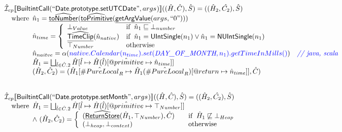 \documentclass{article}
\makeatletter
\newcommand{\SF}[1]{\mbox{\textsf{#1}}}
\newcommand{\comment}[1]{\textit{#1}}
\newcommand{\wherec}[1]{{\rm where}\begin{array}[t]{l}#1\end{array}}
\newcommand{\ifc}[1]{{\rm if}\begin{array}[t]{l}#1\end{array}}
\newcommand{\owc}{{\rm otherwise}}
\newcommand{\aI}{\hat{\mathcal{I}}}
\newcommand{\lbr}{\llbracket}
\newcommand{\rbr}{\rrbracket}
\newcommand{\hf}[1]{\underline{\sf #1}}
\newcommand{\ahf}[1]{\widehat{\underline{\sf #1}}}
\newcommand{\varprop}[1]{@#1}
\newcommand{\avarloc}[1]{\hat{\##1}}
\newcommand{\avarprop}[1]{\hat{@#1}}
\def\inblue{\color{blue}}
\def\inblue{\color{blue}}
\makeatother
\begin{document}
\[\begin{array}{l}
\aI _{cp}\lbr \SF{BuiltintCall}(``\SF{Date.prototype.setUTCDate}",args_{})\rbr((\hat{H},\hat{C}), \hat{S})
  = ((\hat{H}_2, \hat{C_2}), \hat{S})\\
\quad\wherec{
  \hat{n}_{1} = \ahf{toNumber}(\ahf{toPrimitive}(\hf{getArgValue}(args, ``0")))\\
  \hat{n}_{time} = \left\{\begin{array}{ll}
      \bot_{Value} & \ifc{\hat{n}_{1} \sqsubseteq  \bot_{number}}\\
      \ahf{TimeClip}(\hat{n}_{native})
      & \ifc{\hat{n}_{1} = \SF{UIntSingle}(n_{1}) \lor \hat{n}_{1} = \SF{NUIntSingle}(n_{1}) }\\
      \top_{Number} & \owc
    \end{array}\right.\\
  \hat{n}_{naitve} = \alpha({\inblue native.Calendar(n_{time}).set(\emph{DAY\_OF\_MONTH}, n_{1}).getTimeInMills()})
    \quad\comment{{\inblue // java, scala}}\\  
  \hat{H}_1 = \bigsqcup_{\hat{l} \in \hat{C}.2} \hat{H}[\hat{l}
    \mapsto \hat{H}(\hat{l})[\avarprop{primitive} \mapsto \hat{n}_{time}]]\\
  (\hat{H}_2, \hat{C}_2) = 
    (\hat{H}_1[\avarloc{PureLocal}_R \mapsto \hat{H}_1(\avarloc{PureLocal}_R)
      [\varprop{return} \mapsto \hat{n}_{time}]], \hat{C})\\
  }\\
\\\\

\aI _{cp}\lbr \SF{BuiltintCall}(``\SF{Date.prototype.setMonth}",args_{})\rbr((\hat{H},\hat{C}), \hat{S})
  = ((\hat{H}_2, \hat{C_2}), \hat{S})\\
\quad\wherec{
  \hat{H}_1 = \bigsqcup_{\hat{l} \in \hat{C}.2} \hat{H}[\hat{l}
    \mapsto \hat{H}(\hat{l})[\avarprop{primitive} \mapsto \top_{Number}]]\\
  \land\ (\hat{H}_2, \hat{C}_2) = 
    \left\{\begin{array}{l@{\quad\quad}l}
      (\ahf{ReturnStore}(\hat{H}_1, \top_{Number}), \hat{C})
      & \ifc{\hat{H}_1 \not\sqsubseteq \bot_{Heap}}\\
      (\bot_{heap}, \bot_{context}) & \owc \\
    \end{array}\right.\\
  }\\
\\\\



\end{array}\]
\end{document}
